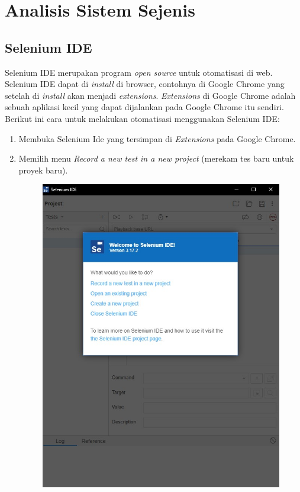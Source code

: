 \section{Analisis Sistem Sejenis}

\subsection{Selenium IDE}
\label{sec:seleniumIDE}  
Selenium IDE merupakan program \textit{open source} untuk otomatisasi di web. Selenium IDE dapat di \textit{install} di browser, contohnya di Google Chrome yang setelah di \textit{install} akan menjadi \textit{extensions}. \textit{Extensions} di Google Chrome adalah sebuah aplikasi kecil yang dapat dijalankan pada Google Chrome itu sendiri. Berikut ini cara untuk melakukan otomatisasi menggunakan Selenium IDE:
\begin{enumerate}
	\item Membuka Selenium Ide yang tersimpan di \textit{Extensions} pada Google Chrome.
	\item Memilih menu \textit{Record a new test in a new project} (merekam tes baru untuk proyek baru).
	\begin{figure}[H]
		\centering
		\includegraphics[scale=0.5]{Gambar/menuSeleniumIDE.jpg}

\end{figure}
\end{enumerate}
